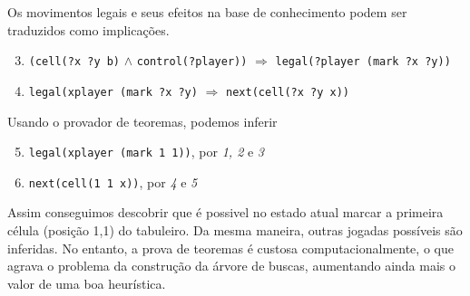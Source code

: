 Os movimentos legais e seus efeitos na base de conhecimento podem ser traduzidos
como implicações. 
\begin{enumerate}
  \setcounter{enumi}{2}
  \item \verb|(cell(?x ?y b)| $\land$ \verb|control(?player))|  
    $\Rightarrow$ \verb|legal(?player (mark ?x ?y))|
  \item \verb|legal(xplayer (mark ?x ?y)| $\Rightarrow$ 
    \verb|next(cell(?x ?y x))|
\end{enumerate}

Usando o provador de teoremas, podemos inferir 
\begin{enumerate}
  \setcounter{enumi}{4}
  \item \verb|legal(xplayer (mark 1 1))|, por {\it 1, 2} e {\it 3}
  \item \verb|next(cell(1 1 x))|, por {\it 4} e {\it 5}
\end{enumerate}

Assim conseguimos descobrir que é possivel no estado atual marcar a primeira
célula (posição 1,1) do tabuleiro. Da mesma maneira, outras jogadas possíveis
são inferidas. No entanto, a prova de teoremas é custosa computacionalmente, o
que agrava o problema da construção da árvore de buscas, aumentando ainda mais o
valor de uma boa heurística.
